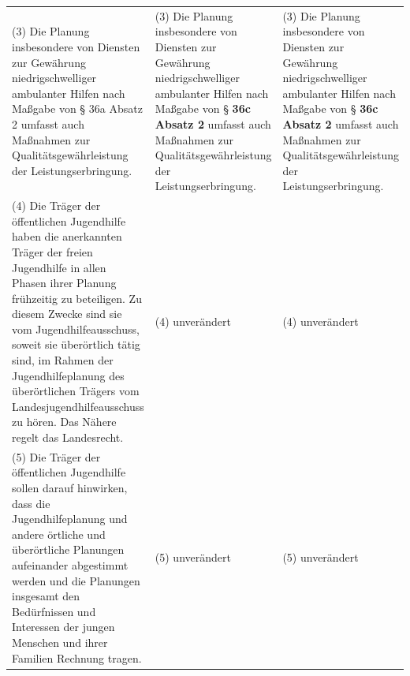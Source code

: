 \documentclass[10pt,a4paper,landscape]{article}
\begin{document}
\begin{longtable}{|L{8.2cm}|L{8.2cm}|L{8.2cm}|}
\hhline{|---|}
(3) Die Planung insbesondere von  \newline Diensten zur Gewährung niedrigschwelliger  \newline ambulanter Hilfen nach Maßgabe von \S{}  \newline \textcolor{diffred}{36a} Absatz 2 umfasst auch Maßnahmen  \newline zur Qualitätsgewährleistung der  \newline Leistungserbringung. & (3) Die Planung insbesondere von  \newline Diensten zur Gewährung niedrigschwelliger  \newline ambulanter Hilfen nach Maßgabe von \S{}  \newline \textbf{36c Absatz 2} umfasst auch Maßnahmen  \newline zur Qualitätsgewährleistung der  \newline Leistungserbringung. & (3) Die Planung insbesondere von  \newline Diensten zur Gewährung niedrigschwelliger  \newline ambulanter Hilfen nach Maßgabe von \S{}  \newline \textbf{36c Absatz 2} umfasst auch Maßnahmen  \newline zur Qualitätsgewährleistung der  \newline Leistungserbringung. \\
\hhline{|---|}
(4) Die Träger der öffentlichen Jugendhilfe  \newline haben die anerkannten Träger der freien  \newline Jugendhilfe in allen Phasen ihrer Planung  \newline frühzeitig zu beteiligen. Zu diesem Zwecke  \newline sind sie vom Jugendhilfeausschuss, soweit  \newline sie überörtlich tätig sind, im Rahmen der  \newline Jugendhilfeplanung des überörtlichen  \newline Trägers vom Landesjugendhilfeausschuss  \newline zu hören. Das Nähere regelt das  \newline Landesrecht. & (4) unverändert & (4) unverändert \\
\hhline{|---|}
(5) Die Träger der öffentlichen Jugendhilfe  \newline sollen darauf hinwirken, dass die  \newline Jugendhilfeplanung und andere örtliche  \newline und überörtliche Planungen aufeinander  \newline abgestimmt werden und die Planungen  \newline insgesamt den Bedürfnissen und  \newline Interessen der jungen Menschen und ihrer  \newline Familien Rechnung tragen. & (5) unverändert & (5) unverändert \\

\end{longtable}
\end{document}
